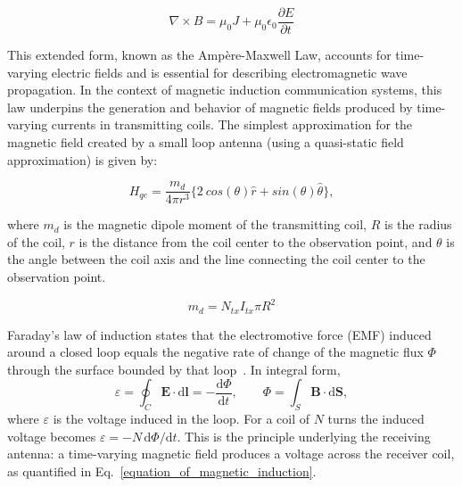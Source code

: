 \begin{equation}
    \label{equation_of_ampere_maxwell}
    \nabla \times B = \mu_{0} J + \mu_{0} \epsilon_{0} \frac{\partial E}{\partial t}
\end{equation}

This extended form, known as the Ampère-Maxwell Law, accounts for time-varying electric fields and is essential for describing electromagnetic wave propagation. In the context of magnetic induction communication systems, this law underpins the generation and behavior of magnetic fields produced by time-varying currents in transmitting coils.
\newp
The simplest approximation for the magnetic field created by a small loop antenna (using a quasi-static field approximation) is given by:

\begin{equation}
    \label{equation_of_magnetic_field}
    H_{qe}=\frac{m_{d}}{4\pi r^{3}}\{2~cos(\theta)\hat{r}+sin(\theta)\hat{\theta}\} ,
\end{equation}

\noindent where $m_{d}$ is the magnetic dipole moment of the transmitting coil, $R$ is the radius of the coil, $r$ is the distance from the coil center to the observation point, and $\theta$ is the angle between the coil axis and the line connecting the coil center to the observation point.

\begin{equation}
    m_d=N_{tx}I_{tx}\pi R^{2}
    \label{eq:magnetic_dipole_moment}
\end{equation}

Faraday's law of induction states that the electromotive force (EMF) induced
around a closed loop equals the negative rate of change of the magnetic flux
$\Phi$ through the surface bounded by that loop~\cite{griffiths2023introduction}.
In integral form,
\begin{equation}
    \label{equation_of_faraday_law}
    \varepsilon = \oint_{C} \mathbf{E}\cdot \mathrm{d}\mathbf{l}
                = -\frac{\mathrm{d}\Phi}{\mathrm{d}t},
    \qquad
    \Phi = \int_{S} \mathbf{B}\cdot \mathrm{d}\mathbf{S},
\end{equation}
where $\varepsilon$ is the voltage induced in the loop. For a coil of $N$ turns the
induced voltage becomes $\varepsilon = -N\,\mathrm{d}\Phi/\mathrm{d}t$. This is the
principle underlying the receiving antenna: a time-varying magnetic field produces
a voltage across the receiver coil, as quantified in Eq.~\eqref{equation_of_magnetic_induction}.
\newp

